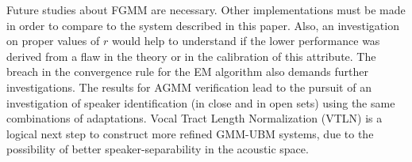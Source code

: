 Future studies about FGMM are necessary. Other implementations must be made in order to compare to the system described in this paper. Also, an investigation on proper values of $r$ would help to understand if the lower performance was derived from a flaw in the theory or in the calibration of this attribute. The breach in the convergence rule for the EM algorithm also demands further investigations. The results for AGMM verification lead to the pursuit of an investigation of speaker identification (in close and in open sets) using the same combinations of adaptations. Vocal Tract Length Normalization (VTLN) is a logical next step to construct more refined GMM-UBM systems, due to the possibility of better speaker-separability in the acoustic space.